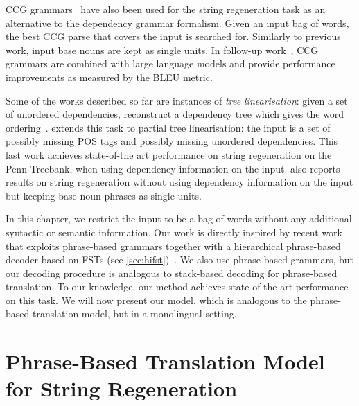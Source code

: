 CCG grammars~\citep{zhang-clark:2011:EMNLP} have also been used
for the string regeneration task as an alternative
to the dependency grammar formalism. Given an input bag
of words, the best CCG parse that covers the input is searched
for. Similarly to previous work, input base nouns are kept as
single units. In follow-up work~\citep{zhang-blackwood-clark:2012:EACL2012},
CCG grammars are combined with large language models
and provide performance improvements as measured by the BLEU
metric.

Some of the works described so far are instances of \emph{tree linearisation}: given
a set of unordered dependencies, reconstruct a dependency tree which gives
the word ordering~\citep{belz-bohnet-mille-wanner-white:2012:INLG}.
\citet{zhang:2013:IJCAI} extends this task to partial tree linearisation: the
input is a set of possibly missing POS tags and possibly missing unordered
dependencies. This last work achieves state-of-the art performance on string regeneration
on the Penn Treebank, when using dependency information on the input.
\citet{zhang:2013:IJCAI} also reports results on string regeneration without
using dependency information on the input but keeping base noun phrases as single
units.

In this chapter, we restrict the input to be a bag of words without any additional
syntactic or semantic information.
Our work is directly inspired by recent work that exploits phrase-based
grammars together with a hierarchical phrase-based decoder based on
FSTs (see \autoref{sec:hifst})~\citep{degispert-tomalin-byrne:2014:EACL}. We
also use phrase-based grammars, but
our decoding procedure is analogous to stack-based decoding for phrase-based
translation.
To our knowledge, our method achieves state-of-the-art performance
on this task. We will now present our model, which is analogous
to the phrase-based translation model, but in a monolingual setting.



\section{Phrase-Based Translation Model for String Regeneration}
\label{sec:gyroPhraseBasedModel}

